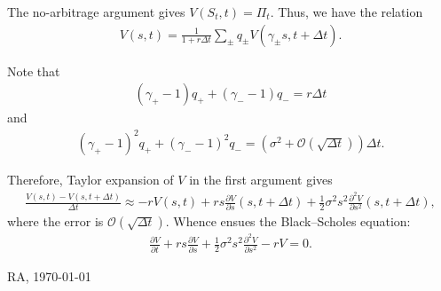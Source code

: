 \documentclass[12pt]{article}
\begin{document}
	The no-arbitrage argument gives $V(S_t, t) = \Pi_t$.
	Thus, we have the relation
	\begin{align}
		V(s, t)
		=
		\frac{1}{1 + r \Delta t}
		\sum_\pm
		q_\pm V(\gamma_\pm s, t + \Delta t)
		.
	\end{align}
	
	Note that
	\begin{align}
		(\gamma_+ - 1) q_+ + (\gamma_- - 1) q_-
		=
		r \Delta t
	\end{align}
	and
	\begin{align}
		(\gamma_+ - 1)^2 q_+ + (\gamma_- - 1)^2 q_-
		=
		(\sigma^2 + \mathcal{O}(\sqrt{\Delta t})) \Delta t
		.
	\end{align}
	
	Therefore, Taylor expansion of $V$ in the first argument gives
	\begin{align}
		\frac{V(s, t) - V(s, t + \Delta t)}{\Delta t}
		\approx
		-r V(s, t)
		+
		r 
		s
		\frac{\partial V}{\partial s}(s, t + \Delta t)
		+
		\frac12
		\sigma^2
		s^2
		\frac{\partial^2 V}{\partial s^2}(s, t + \Delta t)
		,
	\end{align}
	where the error is $\mathcal{O}(\sqrt{\Delta t})$.
	Whence
	ensues the Black--Scholes equation:
	\begin{align}
		\frac{\partial V}{\partial t}
		+
		r
		s
		\frac{\partial V}{\partial s}
		+
		\frac12
		\sigma^2 s^2
		\frac{\partial^2 V}{\partial s^2}	
		-
		r V
		= 0
		.	
	\end{align}
	
	\vfill
	\hfill
	RA, \today
\end{document}
